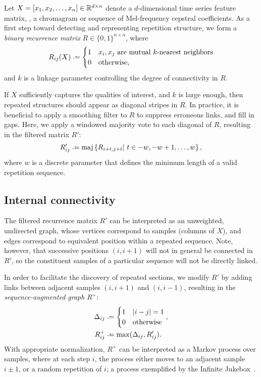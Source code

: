 \documentclass{article}
\begin{document}
Let $X = [x_1, x_2, \dots, x_n] \in \mathbb{R}^{d\times n}$ denote a $d$-dimensional time
series feature matrix, \eg, a chromagram or sequence of Mel-frequency cepstral 
coefficients.  As a first step toward detecting and representing repetition structure, 
we form a \emph{binary recurrence matrix} $R \in \{0,1\}^{n\times n}$, where 
\begin{equation}
R_{ij}(X) \defeq \begin{cases}
1 & x_i, x_j \text{ are mutual $k$-nearest neighbors}\\
0 & \text{otherwise},
\end{cases}
\end{equation}
and $k$ is a linkage parameter controlling the degree of connectivity in $R$.


If $X$ sufficiently captures the qualities of interest, and $k$ is large
enough, then repeated structures should appear as diagonal stripes in $R$.
In practice, it is beneficial to apply a smoothing filter to $R$ to suppress erroneous
links, and fill in gaps.  Here, we apply a windowed majority vote to each diagonal of
$R$, resulting in the filtered matrix $R'$:
\begin{equation}
R'_{ij} \defeq \maj\left\{ R_{i+t, j+t} \given t \in -w, -w+1, \dots, w\right\},
\label{filtered-rep}
\end{equation}
where $w$ is a discrete parameter that defines the minimum length of a valid
repetition sequence.

\subsection{Internal connectivity}
The filtered recurrence matrix $R'$ can be interpreted as an unweighted, undirected 
graph, whose vertices correspond to samples (columns of $X$), and edges correspond 
to equivalent position within a repeated sequence. Note, however, that successive 
positions $(i, i+1)$ will not in general be connected in $R'$, so the constituent 
samples of a particular sequence will not be directly linked.

In order to facilitate the discovery of repeated sections, we modify $R'$ by 
adding links between adjacent samples $(i, i+1)$ and $(i, i-1)$, resulting in the
\emph{sequence-augmented graph} $R^+$:
\begin{eqnarray}
\Delta_{ij} &\defeq \begin{cases}
1 & |i - j| = 1\\
0 & \text{otherwise}
\end{cases},\\
R^+_{ij} &\defeq \max(\Delta_{ij}, R'_{ij})\label{pathmatrix}.
\end{eqnarray}
With appropriate normalization, $R^+$ can be interpreted as a Markov process
over samples, where at each step $i$, the process either moves to an adjacent
sample $i\pm1$, or a random repetition of $i$; a process exemplified by the 
Infinite Jukebox~\cite{infinitejukebox}.
\end{document}
